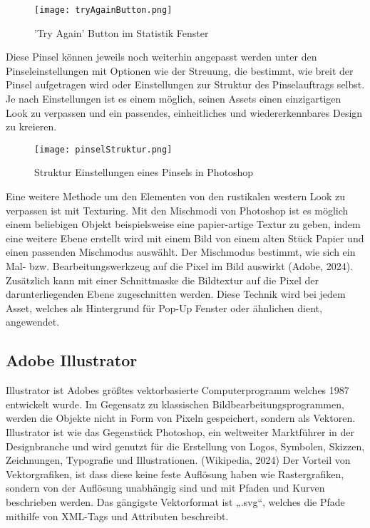 \begin{figure}[H]
    \centering
    \texttt{[image: tryAgainButton.png]}
    \caption{'Try Again' Button im Statistik Fenster}
\end{figure}

Diese Pinsel können jeweils noch weiterhin angepasst werden unter den Pinseleinstellungen mit Optionen wie der Streuung, die bestimmt, wie breit der Pinsel aufgetragen wird oder Einstellungen zur Struktur des Pinselauftrags selbst. Je nach Einstellungen ist es einem möglich, seinen Assets einen einzigartigen Look zu verpassen und ein passendes, einheitliches und wiedererkennbares Design zu kreieren.

\begin{figure}[H]
    \centering
    \texttt{[image: pinselStruktur.png]}
    \caption{Struktur Einstellungen eines Pinsels in Photoshop}
\end{figure}

Eine weitere Methode um den Elementen von \FF den rustikalen western Look zu verpassen ist mit Texturing. Mit den Mischmodi von Photoshop ist es möglich einem beliebigen Objekt beispielsweise eine papier-artige Textur zu geben, indem eine weitere Ebene erstellt wird mit einem Bild von einem alten Stück Papier und einen passenden Mischmodus auswählt. Der Mischmodus bestimmt, wie sich ein Mal- bzw. Bearbeitungswerkzeug auf die Pixel im Bild auswirkt (Adobe, 2024). Zusätzlich kann mit einer Schnittmaske die Bildtextur auf die Pixel der darunterliegenden Ebene zugeschnitten werden. Diese Technik wird bei jedem Asset, welches als Hintergrund für Pop-Up Fenster oder ähnlichen dient, angewendet.

\subsection{Adobe Illustrator}

Illustrator ist Adobes größtes vektorbasierte Computerprogramm welches 1987 entwickelt wurde. Im Gegensatz zu klassischen Bildbearbeitungsprogrammen, werden die Objekte nicht in Form von Pixeln gespeichert, sondern als Vektoren. Illustrator ist wie das Gegenstück Photoshop, ein weltweiter Marktführer in der Designbranche und wird genutzt für die Erstellung von Logos, Symbolen, Skizzen, Zeichnungen, Typografie und Illustrationen. (Wikipedia, 2024) Der Vorteil von Vektorgrafiken, ist dass diese keine feste Auflösung haben wie Rastergrafiken, sondern von der Auflösung unabhängig sind und mit Pfaden und Kurven beschrieben werden. Das gängigste Vektorformat ist „.svg“, welches die Pfade mithilfe von XML-Tags und Attributen beschreibt.

